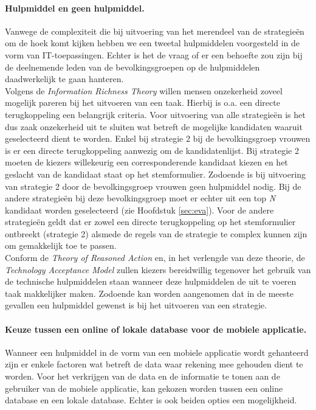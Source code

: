 \paragraph{Hulpmiddel en geen hulpmiddel.} 
Vanwege de complexiteit die bij uitvoering van het merendeel van de strategie\"{e}n om de hoek komt kijken hebben we een tweetal hulpmiddelen voorgesteld in de vorm van IT-toepassingen. Echter is het de vraag of er een behoefte zou zijn bij de deelnemende leden van de bevolkingsgroepen op de hulpmiddelen daadwerkelijk te gaan hanteren. \\
\indent Volgens de \textit{Information Richness Theory} \citep{daft1983information} willen mensen onzekerheid zoveel mogelijk pareren bij het uitvoeren van een taak. Hierbij is o.a. een directe terugkoppeling een belangrijk criteria. Voor uitvoering van alle strategie\"{e}n is het dus zaak onzekerheid uit te sluiten wat betreft de mogelijke kandidaten waaruit geselecteerd dient te worden. Enkel bij strategie 2 bij de bevolkingsgroep vrouwen is er een directe terugkoppeling aanwezig om de kandidatenlijst. Bij strategie 2 moeten de kiezers willekeurig een corresponderende kandidaat kiezen en het geslacht van de kandidaat staat op het stemformulier. Zodoende is bij uitvoering van strategie 2 door de bevolkingsgroep vrouwen geen hulpmiddel nodig. Bij de andere strategie\"{e}n bij deze bevolkingsgroep moet er echter uit een top \textit{N} kandidaat worden geselecteerd (zie Hoofdstuk \ref{sec:eva}). Voor de andere strategie\"{e}n geldt dat er zowel een directe terugkoppeling op het stemformulier ontbreekt (strategie 2) alsmede de regels van de strategie te complex kunnen zijn om gemakkelijk toe te passen. \\
\indent Conform de \textit{Theory of Reasoned Action} \citep{fishbein1977belief,ajzen1991theory} en, in het verlengde van deze theorie, de \textit{Technology Acceptance Model} \citep{davis1989perceived,davis1989user, venkatesh2000determinants} zullen kiezers bereidwillig tegenover het gebruik van de technische hulpmiddelen staan wanneer deze hulpmiddelen de uit te voeren taak makkelijker maken. Zodoende kan worden aangenomen dat in de meeste gevallen een hulpmiddel gewenst is bij het uitvoeren van een strategie. 


\paragraph{Keuze tussen een online of lokale database voor de mobiele applicatie.}
Wanneer een hulpmiddel in de vorm van een mobiele applicatie wordt gehanteerd zijn er enkele factoren wat betreft de data waar rekening mee gehouden dient te worden. Voor het verkrijgen van de data en de informatie te tonen aan de gebruiker van de mobiele applicatie, kan gekozen worden tussen een online database en een lokale database. Echter is ook beiden opties een mogelijkheid.  

